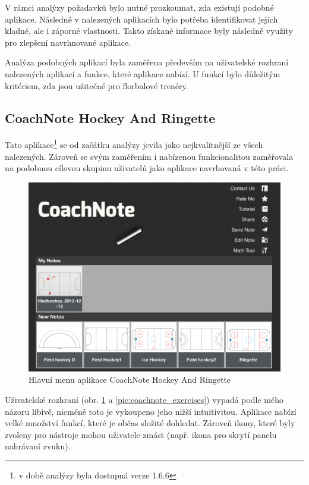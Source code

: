 \documentclass[thesis=B,czech]{FITthesis}[2012/06/26]
\begin{document}
	V rámci analýzy požadavků bylo nutné prozkoumat, zda existují podobné aplikace. Následně v nalezených aplikacích bylo potřeba identifikovat jejich kladné, ale i záporné vlastnosti. Takto získané informace byly následně využity pro zlepšení navrhnované aplikace.

	Analýza podobných aplikací byla zaměřena především na uživatelské rozhraní nalezených aplikací a funkce, které aplikace nabízí. U funkcí bylo důležitým kritériem, zda jsou užitečné pro florbalové trenéry.

	\subsection{CoachNote Hockey And Ringette}

	Tato aplikace\footnote{v době analýzy byla dostupná verze 1.6.6} se od začátku analýzy jevila jako nejkvalitnější ze všech nalezených. Zároveň se svým zaměřením i nabízenou funkcionalitou zaměřovala na podobnou cílovou skupinu uživatelů jako aplikace navrhovaná v této práci.

	\begin{figure}[h!]
		\centering
		\includegraphics[width=\textwidth]{img/competition/coachnote/IMG_0015}
		\caption{Hlavní menu aplikace CoachNote Hockey And Ringette}
		\label{pic:coachnote_menu}
	\end{figure}

	Uživatelské rozhraní (obr. \ref{pic:coachnote_menu} a \ref{pic:coachnote_exercises}) vypadá podle mého názoru líbivě, nicméně toto je vykoupeno jeho nižší intuitivitou. Aplikace nabízí velké množství funkcí, které je občas složité dohledat. Zároveň ikony, které byly zvoleny pro nástroje mohou uživatele zmást (např. ikona pro skrytí panelu nahrávaní zvuku).
\end{document}
